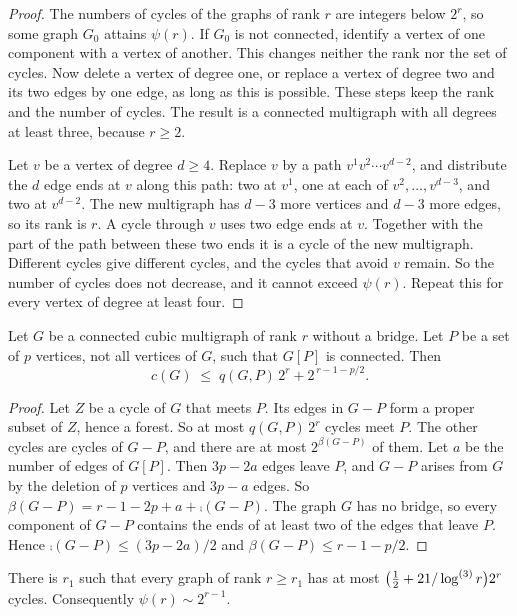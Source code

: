 \begin{proof}
The numbers of cycles of the graphs of rank $r$ are integers below $2^{r}$, so some graph $G_0$
attains $\psi(r)$. If $G_0$ is not connected, identify a vertex of one component with a vertex of
another. This changes neither the rank nor the set of cycles. Now delete a vertex of degree one, or
replace a vertex of degree two and its two edges by one edge, as long as this is possible. These
steps keep the rank and the number of cycles. The result is a connected multigraph with all
degrees at least three, because $r\ge2$.

Let $v$ be a vertex of degree $d\ge4$. Replace $v$ by a path $v^{1}v^{2}\cdots v^{d-2}$, and
distribute the $d$ edge ends at $v$ along this path: two at $v^{1}$, one at each of
$v^{2},\dots,v^{d-3}$, and two at $v^{d-2}$. The new multigraph has $d-3$ more vertices and $d-3$
more edges, so its rank is $r$. A cycle through $v$ uses two edge ends at $v$. Together with the
part of the path between these two ends it is a cycle of the new multigraph. Different cycles give
different cycles, and the cycles that avoid $v$ remain. So the number of cycles does not decrease,
and it cannot exceed $\psi(r)$. Repeat this for every vertex of degree at least four.
\end{proof}

\begin{lemma}\label{lem:marked}
Let $G$ be a connected cubic multigraph of rank $r$ without a bridge. Let $P$ be a set of $p$
vertices, not all vertices of $G$, such that $G[P]$ is connected. Then
\[
  c(G)\;\le\;q(G,P)\,2^{r}+2^{\,r-1-p/2}.
\]
\end{lemma}

\begin{proof}
Let $Z$ be a cycle of $G$ that meets $P$. Its edges in $G-P$ form a proper subset of $Z$, hence a
forest. So at most $q(G,P)\,2^{r}$ cycles meet $P$. The other cycles are cycles of $G-P$, and
there are at most $2^{\beta(G-P)}$ of them. Let $a$ be the number of edges of $G[P]$. Then $3p-2a$
edges leave $P$, and $G-P$ arises from $G$ by the deletion of $p$ vertices and $3p-a$ edges. So
$\beta(G-P)=r-1-2p+a+\comp(G-P)$. The graph $G$ has no bridge, so every component of $G-P$
contains the ends of at least two of the edges that leave $P$. Hence $\comp(G-P)\le(3p-2a)/2$ and
$\beta(G-P)\le r-1-p/2$.
\end{proof}

\begin{corollary}\label{cor:cycles}
There is $r_1$ such that every graph of rank $r\ge r_1$ has at most
$\bigl(\tfrac12+21/\log^{(3)}r\bigr)2^{r}$ cycles. Consequently $\psi(r)\sim2^{r-1}$.
\end{corollary}


